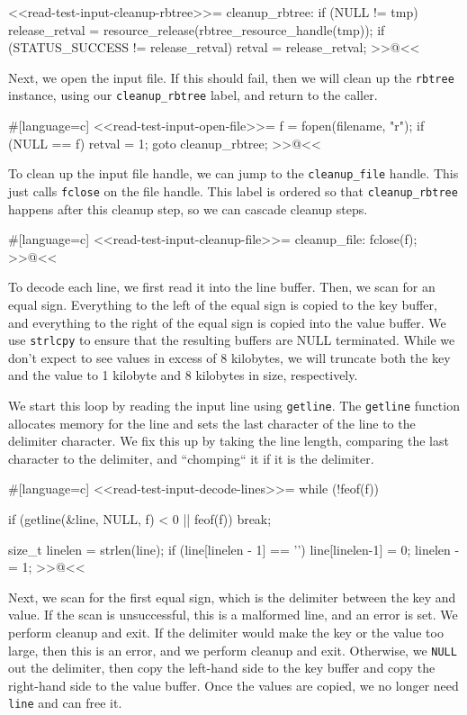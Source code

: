 {<<read-test-input-cleanup-rbtree>>=
cleanup_rbtree:
    if (NULL != tmp)
    {
        release_retval = resource_release(rbtree_resource_handle(tmp));
        if (STATUS_SUCCESS != release_retval)
        {
            retval = release_retval;
        }
    }
>>@<<

Next, we open the input file. If this should fail, then we will clean up the
\verb/rbtree/ instance, using our \verb/cleanup_rbtree/ label, and return to the
caller.

#[language=c]
<<read-test-input-open-file>>=
    f = fopen(filename, "r");
    if (NULL == f)
    {
        retval = 1;
        goto cleanup_rbtree;
    }
>>@<<

To clean up the input file handle, we can jump to the \verb/cleanup_file/
handle. This just calls \verb/fclose/ on the file handle. This label is ordered
so that \verb/cleanup_rbtree/ happens after this cleanup step, so we can cascade
cleanup steps.

#[language=c]
<<read-test-input-cleanup-file>>=
cleanup_file:
    fclose(f);
>>@<<

To decode each line, we first read it into the line buffer. Then, we scan for an
equal sign. Everything to the left of the equal sign is copied to the key
buffer, and everything to the right of the equal sign is copied into the value
buffer. We use \verb/strlcpy/ to ensure that the resulting buffers are NULL
terminated. While we don't expect to see values in excess of 8 kilobytes, we
will truncate both the key and the value to 1 kilobyte and 8 kilobytes in size,
respectively.

We start this loop by reading the input line using \verb/getline/. The
\verb/getline/ function allocates memory for the line and sets the last
character of the line to the delimiter character. We fix this up by taking the
line length, comparing the last character to the delimiter, and ``chomping`` it
if it is the delimiter.

#[language=c]
<<read-test-input-decode-lines>>=
    while (!feof(f))
    {
        if (getline(&line, NULL, f) < 0 || feof(f))
        {
            break;
        }

        size_t linelen = strlen(line);
        if (line[linelen - 1] == '\n')
        {
            line[linelen-1] = 0;
            linelen -= 1;
        }
>>@<<

Next, we scan for the first equal sign, which is the delimiter between the key
and value. If the scan is unsuccessful, this is a malformed line, and an error
is set. We perform cleanup and exit.  If the delimiter would make the key or the
value too large, then this is an error, and we perform cleanup and exit.
Otherwise, we \verb/NULL/ out the delimiter, then copy the left-hand side to the
key buffer and copy the right-hand side to the value buffer. Once the values are
copied, we no longer need \verb/line/ and can free it.

}}
